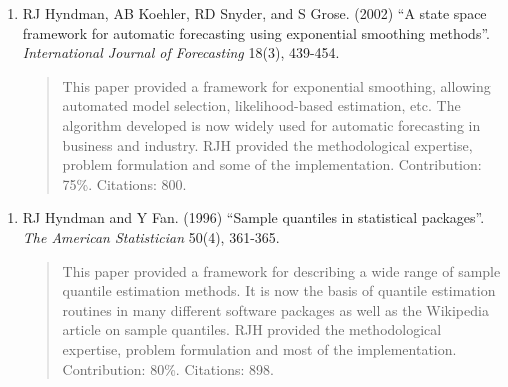 \documentclass[10pt,a4paper,]{article}
\providecommand{\tightlist}{%
  \setlength{\itemsep}{0pt}\setlength{\parskip}{0pt}}
\begin{document}
\vspace*{0.2cm}

\begin{enumerate}
\def\labelenumi{\arabic{enumi}.}
\setcounter{enumi}{8}
\tightlist
\item
  RJ Hyndman, AB Koehler, RD Snyder, and S Grose. (2002) ``A state space
  framework for automatic forecasting using exponential smoothing
  methods''. \emph{International Journal of Forecasting} 18(3), 439-454.

  \begin{quote}     This paper provided a framework for exponential smoothing, allowing automated model selection, likelihood-based estimation, etc. The algorithm developed is now widely used for automatic forecasting in business and industry. RJH provided the methodological expertise, problem formulation and some of the implementation. Contribution: 75\%.  Citations: 800.\end{quote}
\end{enumerate}

\vspace*{0.2cm}

\begin{enumerate}
\def\labelenumi{\arabic{enumi}.}
\setcounter{enumi}{9}
\tightlist
\item
  RJ Hyndman and Y Fan. (1996) ``Sample quantiles in statistical
  packages''. \emph{The American Statistician} 50(4), 361-365.

  \begin{quote}     This paper provided a framework for describing a wide range of sample quantile estimation methods. It is now the basis of quantile estimation routines in many different software packages as well as the Wikipedia article on sample quantiles.  RJH provided the methodological expertise, problem formulation and most of the implementation. Contribution: 80\%.  Citations: 898.\end{quote}
\end{enumerate}

\vspace*{0.2cm}
\end{document}
